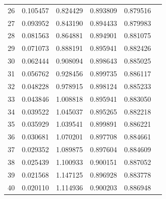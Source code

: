 \begin{table}[ht]
\begin{tabular}{c c c c c c}
26 & 0.105457 & 0.824429 & 0.893809 & 0.879516 \\
27 & 0.093952 & 0.843190 & 0.894433 & 0.879983 \\
28 & 0.081563 & 0.864881 & 0.894901 & 0.881075 \\
29 & 0.071073 & 0.888191 & 0.895941 & 0.882426 \\
30 & 0.062444 & 0.908094 & 0.898643 & 0.885025 \\
31 & 0.056762 & 0.928456 & 0.899735 & 0.886117 \\
32 & 0.048228 & 0.978915 & 0.898124 & 0.885233 \\
33 & 0.043846 & 1.008818 & 0.895941 & 0.883050 \\
34 & 0.039522 & 1.045037 & 0.895265 & 0.882218 \\
35 & 0.035929 & 1.039541 & 0.899891 & 0.886221 \\
36 & 0.030681 & 1.070201 & 0.897708 & 0.884661 \\
37 & 0.029352 & 1.089875 & 0.897604 & 0.884609 \\
38 & 0.025439 & 1.100933 & 0.900151 & 0.887052 \\
39 & 0.021568 & 1.147125 & 0.896928 & 0.883778 \\
40 & 0.020110 & 1.114936 & 0.900203 & 0.886948 \\
\hline
\end{tabular}
\end{table}

